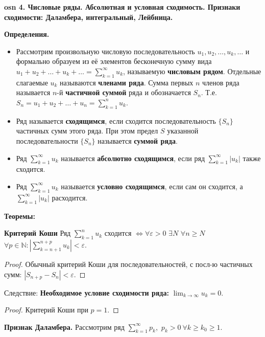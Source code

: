 \textbf{\LARGE osn 4. Числовые ряды. Абсолютная и условная сходимость. Признаки сходимости: Даламбера, интегральный, Лейбница.}

\textbf{Определения.}
\begin{itemize}
    \item Рассмотрим произвольную числовую последовательность $u_1,u_2,\dots,u_k,\dots$ и формально
    образуем из её элементов бесконечную сумму вида
    $u_1 +u_2 +\dots+u_k +\dots= \displaystyle \sum_{k=1}^{\infty}u_k$, называемую \textbf{числовым рядом}.
    Отдельные слагаемые $u_k$ называются \textbf{членами ряда}.
    Сумма первых $n$ членов ряда называется $n$-й \textbf{частичной суммой} ряда и обозначается $S_n$.
    Т.е. $S_n =u_1 +u_2 +\dots+u_n = \displaystyle \sum_{k=1}^n u_k$.
    \item Ряд называется \textbf{сходящимся}, если сходится последовательность $\{S_n\}$ частичных сумм этого ряда.
    При этом предел $S$ указанной последовательности $\{S_n\}$ называется \textbf{суммой ряда}.
    
    \item Ряд $\displaystyle \sum_{k=1}^{\infty}u_k$ называется \textbf{абсолютно сходящимся}, если ряд $\displaystyle \sum_{k=1}^{\infty}|u_k|$ также сходится.

    \item Ряд $\displaystyle \sum_{k=1}^{\infty}u_k$ называется \textbf{условно сходящимся}, если сам он сходится, а $\displaystyle \sum_{k=1}^{\infty}|u_k|$ расходится.
\end{itemize}

\textbf{Теоремы:}

\textbf{Критерий Коши} Ряд $\displaystyle \sum_{k=1}^n u_k$ сходится $\iff \forall \varepsilon > 0$ $\exists N$ $\forall n \geq N$ $ \forall p \in \mathbb{N} : \displaystyle \left|\sum_{k=n+1}^{n+p} u_k\right| < \varepsilon$.

\begin{proof}
    Обычный критерий Коши для последовательностей, с посл-ю частичных сумм: $|S_{n+p} - S_n| < \varepsilon$.
\end{proof}

Следствие: \textbf{Необходимое условие сходимости ряда:} $\lim_{k\rightarrow\infty} u_k=0$.

\begin{proof}
    Критерий Коши при $p = 1$.
\end{proof}

\bigbreak
\textbf{Признак Даламбера.}
Рассмотрим ряд $\displaystyle \sum_{k=1}^{\infty}p_k$,~$p_k > 0~\forall k \geqslant k_0 \geqslant 1$.

